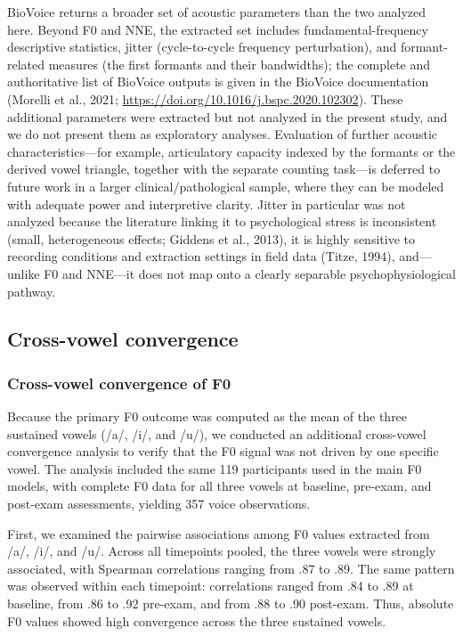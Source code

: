 \documentclass[
  english,
  man,floatsintext]{apa6}
\begin{document}
BioVoice returns a broader set of acoustic parameters than the two analyzed here. Beyond F0 and NNE, the extracted set includes fundamental-frequency descriptive statistics, jitter (cycle-to-cycle frequency perturbation), and formant-related measures (the first formants and their bandwidths); the complete and authoritative list of BioVoice outputs is given in the BioVoice documentation (Morelli et al., 2021; \url{https://doi.org/10.1016/j.bspc.2020.102302}). These additional parameters were extracted but not analyzed in the present study, and we do not present them as exploratory analyses. Evaluation of further acoustic characteristics---for example, articulatory capacity indexed by the formants or the derived vowel triangle, together with the separate counting task---is deferred to future work in a larger clinical/pathological sample, where they can be modeled with adequate power and interpretive clarity. Jitter in particular was not analyzed because the literature linking it to psychological stress is inconsistent (small, heterogeneous effects; Giddens et al., 2013), it is highly sensitive to recording conditions and extraction settings in field data (Titze, 1994), and---unlike F0 and NNE---it does not map onto a clearly separable psychophysiological pathway.

\subsection{Cross-vowel convergence}\label{cross-vowel-convergence}

\subsubsection{Cross-vowel convergence of F0}\label{cross-vowel-convergence-of-f0}

Because the primary F0 outcome was computed as the mean of the three sustained vowels (/a/, /i/, and /u/), we conducted an additional cross-vowel convergence analysis to verify that the F0 signal was not driven by one specific vowel. The analysis included the same 119 participants used in the main F0 models, with complete F0 data for all three vowels at baseline, pre-exam, and post-exam assessments, yielding 357 voice observations.

First, we examined the pairwise associations among F0 values extracted from /a/, /i/, and /u/. Across all timepoints pooled, the three vowels were strongly associated, with Spearman correlations ranging from .87 to .89. The same pattern was observed within each timepoint: correlations ranged from .84 to .89 at baseline, from .86 to .92 pre-exam, and from .88 to .90 post-exam. Thus, absolute F0 values showed high convergence across the three sustained vowels.
\end{document}
